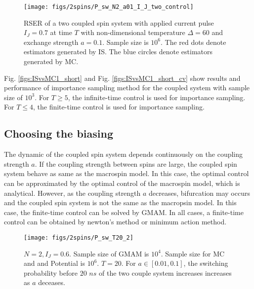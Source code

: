 \documentclass[journal,transmag]{IEEEtran}
\begin{document}
 \begin{figure}[h]
   \centering
         \texttt{[image: figs/2spins/P\_sw\_N2\_a01\_I\_J\_two\_control]}    
   \caption{RSER of a two coupled spin system with applied current pulse $I_J = 0.7$ at time $T$ with non-dimensional temperature $\Delta = 60$ and exchange strength $ a = 0.1$. Sample size is $10^6$. The red dots denote estimators generated by IS.  The blue circles denote estimators generated by MC. }
\end{figure}
%
Fig. \ref{figs:ISvsMC1_short} and Fig. \ref{figs:ISvsMC1_short_cv} show results and performance of importance sampling method for the coupled system with sample size of $10^3$. For $T \ge 5$, the infinite-time control is used for importance sampling. For $T \le 4$, the finite-time control is used for importance sampling.  
\subsection{Choosing the biasing}
The dynamic of the coupled spin system depends continuously on the coupling strength $a$. If the coupling strength between spins are large, the coupled spin system behave as same as the macrospin model. In this case, the optimal control can be approximated by the optimal control of the macrospin model, which is analytical. However, as the coupling strength $a$ decreases, bifurcation may occurs and the coupled spin system is not the same as the macropsin model. In this case, the finite-time control can be solved by GMAM. In all cases, a finite-time control can be obtained by newton's method or minimum action method. 

 \begin{figure}[h]
   \centering
         \texttt{[image: figs/2spins/P\_sw\_T20\_2]}
   \caption{$N = 2, I_J= 0.6$. Sample size of GMAM is $10^4$. Sample size for MC and and Potential  is $10^6$. $T = 20$. For $a \in [0.01, 0.1]$, the switching probability before $20$ $ns$  of the two couple system increases increases as $a$ deceases.}
      \label{figs:ISvsMC3}
\end{figure}
\end{document}
